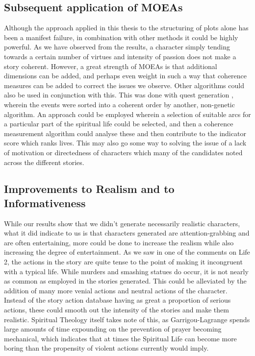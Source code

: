 \documentclass[12pt]{article}
\begin{document}
\subsection{Subsequent application of MOEAs}
Although the approach applied in this thesis to the structuring of plots alone has been a manifest failure, in combination with other methods it could be highly powerful. As we have observed from the results, a character simply tending towards a certain number of virtues and intensity of passion does not make a story coherent. However, a great strength of MOEAs is that additional dimensions can be added, and perhaps even weight in such a way that coherence measures can be added to correct the issues we observe. Other algorithms could also be used in conjunction with this. This was done with quest generation \cite{questgeneration}, wherein the events were sorted into a coherent order by another, non-genetic algorithm. An approach could be employed wherein a selection of suitable arcs for a particular part of the spiritual life could be selected, and then a coherence measurement algorithm could analyse these and then contribute to the indicator score which ranks lives. This may also go some way to solving the issue of a lack of motivation or directedness of characters which many of the candidates noted across the different stories. 

\subsection{Improvements to Realism and to Informativeness}
While our results show that we didn't generate necessarily realistic characters, what it did indicate to us is that characters generated are attention-grabbing and are often entertaining, more could be done to increase the realism while also increasing the degree of entertainment. As we saw in one of the comments on Life 2, the actions in the story are quite tense to the point of making it incongruent with a typical life. While murders and smashing statues do occur, it is not nearly as common as employed in the stories generated. This could be alleviated by the addition of many more venial actions and neutral actions of the character. Instead of the story action database having as great a proportion of serious actions, these could smooth out the intensity of the stories and make them realistic. Spiritual Theology itself takes note of this, as Garrigou-Lagrange spends large amounts of time expounding on the prevention of prayer becoming mechanical, which indicates that at times the Spiritual Life can become more boring\cite{garrigou2013three} than the propensity of violent actions currently would imply.\\
\end{document}
